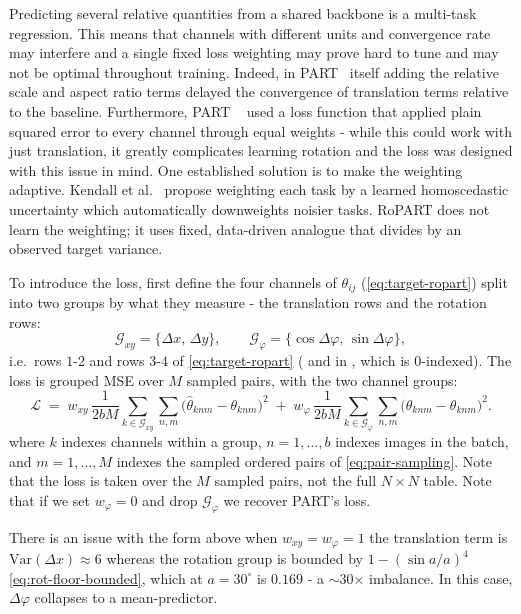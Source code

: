\documentclass[final_report.tex]{subfiles}
\begin{document}
Predicting several relative quantities from a shared backbone is a multi-task regression. This means that channels with different units and convergence rate may interfere and a single fixed loss weighting may prove hard to tune and may not be optimal throughout training. Indeed, in PART~\cite{part} itself adding the relative scale and aspect ratio terms delayed the convergence of translation terms relative to the baseline. Furthermore, PART ~\cite{part} used a loss function that applied plain squared error to every channel through equal weights - while this could work with just translation, it greatly complicates learning rotation and the loss was designed with this issue in mind. One established solution is to make the weighting adaptive. Kendall et al.~\cite{kendall} propose weighting each task by a learned homoscedastic uncertainty which automatically downweights noisier tasks. RoPART does not learn the weighting; it uses fixed, data-driven analogue that divides by an observed target variance. 

To introduce the loss, first define the four channels of $\theta_{ij}$ (\cref{eq:target-ropart}) split into two groups by what they measure - the translation rows and the rotation rows:
  \begin{equation}\label{eq:channel-groups}
    \mathcal{G}_{xy} = \{\Delta x,\, \Delta y\},
    \qquad
    \mathcal{G}_{\varphi} = \{\cos\Delta\varphi,\, \sin\Delta\varphi\},
  \end{equation}
  i.e.\ rows $1$-$2$ and rows $3$-$4$ of \cref{eq:target-ropart}
  (\py{[:, 0:2]} and \py{[:, 2:4]} in , which is $0$-indexed). The loss is grouped MSE over $M$ sampled pairs, with the two channel groups:
\begin{equation}\label{eq:loss-none}
  \mathcal{L}
  \;=\; w_{xy}\,\frac{1}{2 b M}\!\!\sum_{k \in \mathcal{G}_{xy}}\sum_{n,m}\!\bigl(\hat\theta_{knm} - \theta_{knm}\bigr)^2
  \;+\; w_{\varphi}\,\frac{1}{2 b M}\!\!\sum_{k \in \mathcal{G}_{\varphi}}\sum_{n,m}\!\bigl(\hat\theta_{knm} - \theta_{knm}\bigr)^2 .
\end{equation}
where $k$ indexes channels within a group, $n=1,\dots,b$ indexes images in the batch, and $m=1,\dots,M$ indexes the sampled ordered pairs of \cref{eq:pair-sampling}. Note that the loss is taken over the $M$ sampled pairs, not the full $N\times N$ table. Note that if we set $w_\varphi=0$ and drop $\mathcal{G}_\varphi$ we recover PART's loss.

There is an issue with the form above when $w_{xy}=w_\varphi=1$ the translation term is $\mathrm{Var}(\Delta x)\approx 6$ whereas the rotation group is bounded by $1-(\sin a/a)^4$ \cref {eq:rot-floor-bounded}, which at $a=30^\circ$ is $0.169$ - a $\sim$30$\times$ imbalance. In this case, $\Delta\varphi$ collapses to a mean-predictor. 
\end{document}
